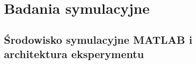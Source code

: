 \section{Badania symulacyjne}
\label{sec:simulation_results}


\subsection{Środowisko symulacyjne MATLAB i architektura eksperymentu}
\label{subsec:sim_environment}

